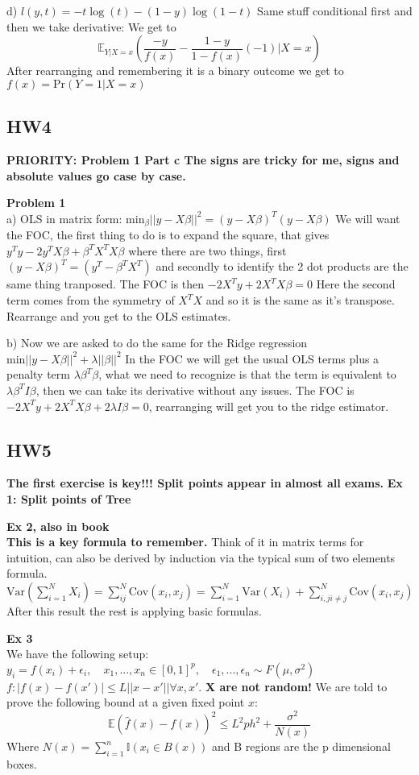 \documentclass{article}
\begin{document}
d) $l(y,t) = -t \log(t) - (1-y) \log(1-t)$ Same stuff conditional first and then we take derivative:
We get to $$\mathbb{E}_{Y|X=x}(\frac{-y}{f(x)} - \frac{1-y}{1-f(x)}(-1)|X=x) $$
After rearranging and remembering it is a binary outcome we get to $f(x) = \text{Pr}(Y=1|X=x) $
\subsection*{HW4}
\textbf{PRIORITY: Problem 1 Part c The signs are tricky for me, signs and absolute values go case by case.}

\noindent\textbf{Problem 1}
\\
a) OLS in matrix form: $\text{min}_\beta ||y-X\beta||^2 = (y-X\beta)^T(y-X\beta)$
We will want the FOC, the first thing to do is to expand the square, that gives
$y^T y - 2y^TX\beta + \beta^TX^TX\beta$ where there are two things, first $(y-X\beta)^T = (y^T -\beta^TX^T)$ and
secondly to identify the 2 dot products are the same thing tranposed. 
The FOC is then $-2X^T y + 2X^TX\beta = 0$ Here the second term comes from the symmetry of $X^TX$ and so it is the same as it's transpose.
Rearrange and you get to the OLS estimates.


b) Now we are asked to do the same for the Ridge regression $\text{min} ||y-X\beta||^2 +\lambda||\beta||^2$
In the FOC we will get the usual OLS terms plus a penalty term $\lambda \beta^T \beta$, what we need to recognize is that the term is equivalent to $\lambda \beta^T I \beta$, 
then we can take its derivative without any issues. 
The FOC is $-2X^Ty +2X^TX\beta + 2\lambda I \beta = 0$, rearranging will get you to 
the ridge estimator. 
\subsection*{HW5}
\textbf{The first exercise is key!!! Split points appear in almost all exams.}
\textbf{Ex 1: Split points of Tree}

\textbf{Ex 2, also in book}\\
\textbf{This is a key formula to remember.} Think of it in matrix terms for intuition, can also be 
derived by induction via the typical sum of two elements formula.
\noindent
$\text{Var}(\sum_{i=1}^{N}X_i) = \sum_{ij}^{N} \text{Cov}(x_i, x_j) = \sum_{i=1}^{N}\text{Var}(X_i) + \sum_{i,j i\neq j}^{N}\text{Cov}(x_i,x_j)$
After this result the rest is applying basic formulas. 

\textbf{Ex 3}\\
We have the following setup: $y_i = f(x_i) + \epsilon_i, \quad x_1,...,x_n \in [0,1]^p, \quad \epsilon_1,...,\epsilon_n \sim F(\mu,\sigma^2)$ 
$f : |f(x) - f(x')| \leq L||x- x'|| \forall x,x'$. 
\textbf{X are not random!}
We are told to prove the following bound at a given fixed point $x$: 
$$\mathbb{E}(\hat{f}(x)-f(x))^2 \leq L^2ph^2 + \frac{\sigma^2}{N(x)} $$
Where $N(x) = \sum_{i=1}^{n}\mathbb{I}(x_i \in B(x))$ and B regions are the p dimensional boxes. 
\end{document}
